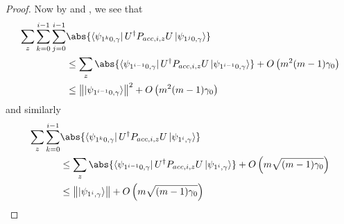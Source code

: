 \begin{proof}
	Now by  and , we see that
	\begin{align*}
		\sum_z \sum_{k=0}^{i-1}\sum_{j=0}^{i-1}
		&\abs{\bra{\psi_{1^k0,\gamma}}U^\dag  P_{acc,i,z}U \ket{\psi_{1^j0,\gamma}}} \\
		&\leq\sum_z \abs{\bra{\psi_{1^{i-1}0,\gamma}}U^\dag  P_{acc,i,z}U \ket{\psi_{1^{i-1}0,\gamma}}} + O\L(m^2(m-1)\gamma_0\R) \\
		&\leq\norm{\ket{\psi_{1^{i-1}0,\gamma}}}^2 + O\L(m^2(m-1)\gamma_0\R)
	\end{align*}
	and similarly
	\begin{align*}
		\sum_z\sum_{k=0}^{i-1}
		&\abs{\bra{\psi_{1^k0,\gamma}}U^\dag  P_{acc,i,z}U \ket{\psi_{1^i,\gamma}}}\\
		&\leq\sum_z\abs{\bra{\psi_{1^{i-1}0,\gamma}}U^\dag  P_{acc,i,z}U \ket{\psi_{1^i,\gamma}}}+O\L(m\sqrt{(m-1)\gamma_0}\R)\\
		&\leq\norm{\ket{\psi_{1^i,\gamma}}}+O\L(m\sqrt{(m-1)\gamma_0}\R)
	\end{align*}
\end{proof}

